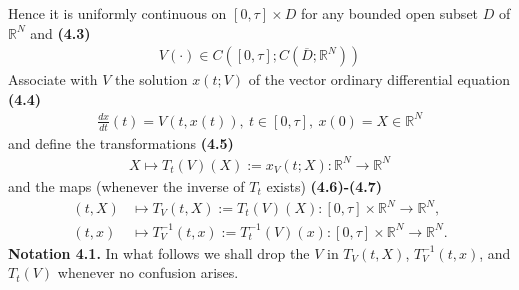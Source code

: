 \documentclass{book}
\numberwithin{equation}{section}
\begin{document}
\begin{enumerate}
    Hence it is uniformly continuous on $[0,\tau]\times D$ for any bounded open subset $D$ of $\mathbb{R}^N$ and \textbf{(4.3)}
    \begin{align*}
        V(\cdot)\in C\left([0,\tau];C\left(\overline{D};\mathbb{R}^N\right)\right)
    \end{align*}
    Associate with $V$ the solution $x(t;V)$ of the vector ordinary differential equation \textbf{(4.4)}
    \begin{align*}
        \frac{dx}{dt}(t) = V\left(t,x(t)\right),\ t\in[0,\tau],\ x(0) = X\in\mathbb{R}^N
    \end{align*}
    and define the transformations \textbf{(4.5)}
    \begin{align*}
        X\mapsto T_t(V)(X) := x_V(t;X):\mathbb{R}^N\to\mathbb{R}^N
    \end{align*}
    and the maps (whenever the inverse of $T_t$ exists) \textbf{(4.6)-(4.7)}
    \begin{align*}
        (t,X)&\mapsto T_V(t,X) := T_t(V)(X):[0,\tau]\times\mathbb{R}^N\to\mathbb{R}^N,\\
        (t,x)&\mapsto T_V^{-1}(t,x) := T_t^{-1}(V)(x):[0,\tau]\times\mathbb{R}^N\to\mathbb{R}^N.
    \end{align*}
    \textbf{Notation 4.1.} In what follows we shall drop the $V$ in $T_V(t,X)$, $T_V^{-1}(t,x)$, and $T_t(V)$ whenever no confusion arises.
    

\end{enumerate}
\end{document}
